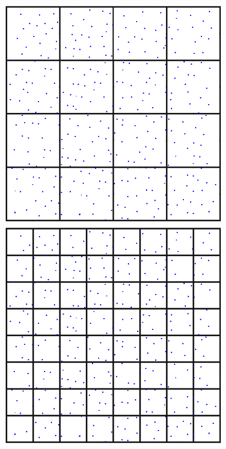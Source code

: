 \documentclass[11pt, oneside]{article}   	%
\begin{document}
\begin{figure}[h]
\includegraphics[scale=0.25]{b2}
\includegraphics[scale=0.25]{b3}
\end{figure}
\end{document}
